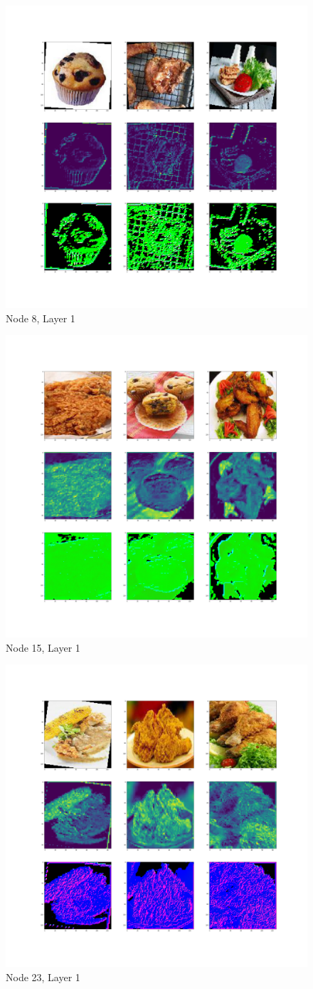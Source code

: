 \documentclass[12pt]{article}
\begin{document}
\begin{figure} [H]
	\centering
	\includegraphics[width=0.7\linewidth]{../diagrams/node8_layer1_DMF}
	\caption{Node 8, Layer 1}
	\label{fig:node8layer1dmf}
\end{figure}
\begin{figure}[H]
	\centering
	\includegraphics[width=0.7\linewidth]{../diagrams/node15_layer1_DMF}
	\caption{Node 15, Layer 1}
	\label{fig:node15layer1dmf}
\end{figure}
\begin{figure}[H]
	\centering
	\includegraphics[width=0.7\linewidth]{../diagrams/node23_layer1_DMF}
	\caption{Node 23, Layer 1}
	\label{fig:node23layer1dmf}
\end{figure}
\end{document}
